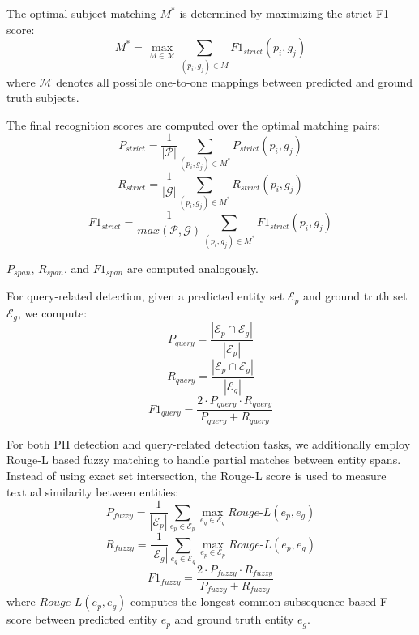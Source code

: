 The optimal subject matching $M^*$ is determined by maximizing the strict F1 score:
\begin{equation}
    M^* = \max_{M \in \mathcal{M}} \sum_{(p_i, g_j) \in M} F1_{strict}(p_i, g_j)
\end{equation}
where $\mathcal{M}$ denotes all possible one-to-one mappings between predicted and ground truth subjects.

The final recognition scores are computed over the optimal matching pairs:
\begin{equation}
    P_{strict} = \frac{1}{|\mathcal{P}|} \sum_{(p_i, g_j) \in M^*} P_{strict}(p_i, g_j)
\end{equation}
\begin{equation}
    R_{strict} = \frac{1}{|\mathcal{G}|} \sum_{(p_i, g_j) \in M^*} R_{strict}(p_i, g_j)
\end{equation}
\begin{equation}
    F1_{strict} = \frac{1}{max(\mathcal{P},\mathcal{G})} \sum_{(p_i, g_j) \in M^*} F1_{strict}(p_i, g_j)
\end{equation}

$P_{span}$, $R_{span}$, and $F1_{span}$ are computed analogously.

For query-related detection, given a predicted entity set $\mathcal{E}_p$ and ground truth set $\mathcal{E}_g$, we compute:
\begin{equation}
    P_{query} = \frac{|\mathcal{E}_p \cap \mathcal{E}_g|}{|\mathcal{E}_p|}
\end{equation}
\begin{equation}
    R_{query} = \frac{|\mathcal{E}_p \cap \mathcal{E}_g|}{|\mathcal{E}_g|}
\end{equation}
\begin{equation}
    F1_{query} = \frac{2 \cdot P_{query} \cdot R_{query}}{P_{query} + R_{query}}
\end{equation}

For both PII detection and query-related detection tasks, we additionally employ Rouge-L based fuzzy matching to handle partial matches between entity spans. Instead of using exact set intersection, the Rouge-L score is used to measure textual similarity between entities:
\begin{equation}
    P_{fuzzy} = \frac{1}{|\mathcal{E}_p|} \sum_{e_p \in \mathcal{E}_p} \max_{e_g \in \mathcal{E}_g} Rouge\text{-}L(e_p, e_g)
\end{equation}
\begin{equation}
    R_{fuzzy} = \frac{1}{|\mathcal{E}_g|} \sum_{e_g \in \mathcal{E}_g} \max_{e_p \in \mathcal{E}_p} Rouge\text{-}L(e_p, e_g)
\end{equation}
\begin{equation}
    F1_{fuzzy} = \frac{2 \cdot P_{fuzzy} \cdot R_{fuzzy}}{P_{fuzzy} + R_{fuzzy}}
\end{equation}
where $Rouge\text{-}L(e_p, e_g)$ computes the longest common subsequence-based F-score between predicted entity $e_p$ and ground truth entity $e_g$.

